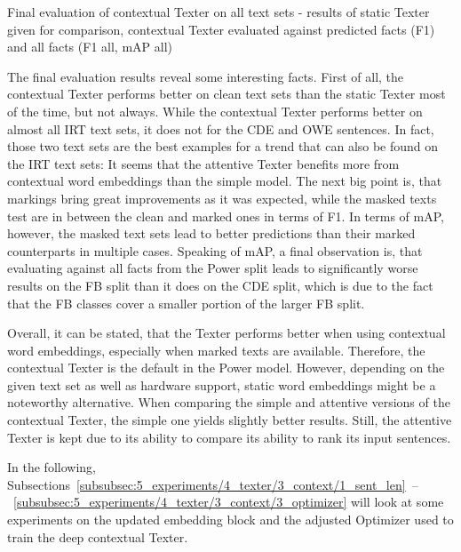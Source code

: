 \begin{table}
    \centering
    
    \caption{Final evaluation of contextual Texter on all text sets - results of static Texter given for comparison, contextual Texter evaluated against predicted facts (F1) and all facts (F1 all, mAP all)}
    \label{tab:5_experiments/4_texter/3_context/results}
\end{table}

The final evaluation results reveal some interesting facts. First of all, the contextual Texter performs better on clean text sets than the static Texter most of the time, but not always. While the contextual Texter performs better on almost all IRT text sets, it does not for the CDE and OWE sentences. In fact, those two text sets are the best examples for a trend that can also be found on the IRT text sets: It seems that the attentive Texter benefits more from contextual word embeddings than the simple model. The next big point is, that markings bring great improvements as it was expected, while the masked texts test are in between the clean and marked ones in terms of F1. In terms of mAP, however, the masked text sets lead to better predictions than their marked counterparts in multiple cases. Speaking of mAP, a final observation is, that evaluating against all facts from the Power split leads to significantly worse results on the FB split than it does on the CDE split, which is due to the fact that the FB classes cover a smaller portion of the larger FB split.

Overall, it can be stated, that the Texter performs better when using contextual word embeddings, especially when marked texts are available. Therefore, the contextual Texter is the default in the Power model. However, depending on the given text set as well as hardware support, static word embeddings might be a noteworthy alternative. When comparing the simple and attentive versions of the contextual Texter, the simple one yields slightly better results. Still, the attentive Texter is kept due to its ability to compare its ability to rank its input sentences.

In the following, Subsections~\ref{subsubsec:5_experiments/4_texter/3_context/1_sent_len}~--~\ref{subsubsec:5_experiments/4_texter/3_context/3_optimizer} will look at some experiments on the updated embedding block and the adjusted Optimizer used to train the deep contextual Texter.


